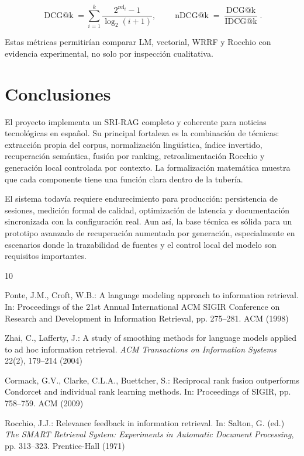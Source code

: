 \documentclass[a4paper]{llncs}
\begin{document}
\begin{equation}
\operatorname{DCG@k}=\sum_{i=1}^{k}
\frac{2^{\operatorname{rel}_i}-1}{\log_2(i+1)},
\qquad
\operatorname{nDCG@k}=
\frac{\operatorname{DCG@k}}{\operatorname{IDCG@k}}.
\end{equation}

Estas métricas permitirían comparar LM, vectorial, WRRF y Rocchio con evidencia experimental, no solo por inspección cualitativa.

\section{Conclusiones}

El proyecto implementa un SRI-RAG completo y coherente para noticias tecnológicas en español. Su principal fortaleza es la combinación de técnicas: extracción propia del corpus, normalización lingüística, índice invertido, recuperación semántica, fusión por ranking, retroalimentación Rocchio y generación local controlada por contexto. La formalización matemática muestra que cada componente tiene una función clara dentro de la tubería.

El sistema todavía requiere endurecimiento para producción: persistencia de sesiones, medición formal de calidad, optimización de latencia y documentación sincronizada con la configuración real. Aun así, la base técnica es sólida para un prototipo avanzado de recuperación aumentada por generación, especialmente en escenarios donde la trazabilidad de fuentes y el control local del modelo son requisitos importantes.

\begin{thebibliography}{10}

Ponte, J.M., Croft, W.B.: A language modeling approach to information retrieval. In: Proceedings of the 21st Annual International ACM SIGIR Conference on Research and Development in Information Retrieval, pp. 275--281. ACM (1998)

Zhai, C., Lafferty, J.: A study of smoothing methods for language models applied to ad hoc information retrieval. \emph{ACM Transactions on Information Systems} 22(2), 179--214 (2004)

Cormack, G.V., Clarke, C.L.A., Buettcher, S.: Reciprocal rank fusion outperforms Condorcet and individual rank learning methods. In: Proceedings of SIGIR, pp. 758--759. ACM (2009)

Rocchio, J.J.: Relevance feedback in information retrieval. In: Salton, G. (ed.) \emph{The SMART Retrieval System: Experiments in Automatic Document Processing}, pp. 313--323. Prentice-Hall (1971)

\end{thebibliography}
\end{document}
